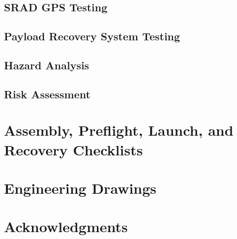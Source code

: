 \documentclass[report, wip, nodwg]{sac}
\begin{document}
    \subsection{SRAD GPS Testing}\label{gps-test}
    \pageleftblank

	\subsection{Payload Recovery System Testing}\label{test-payload-recovery}
    \pageleftblank
    
	\begin{landscape}
		\section{Hazard Analysis}\label{hazard}
		\helptext{\HazardAnalysisDescription}

		
	\end{landscape}

    \pagebreak
    
	\begin{landscape}
		\section{Risk Assessment}\label{risk}
		\helptext{\RiskAssessmentDescription}
	\end{landscape}

	\section{Assembly, Preflight, Launch, and Recovery Checklists} \label{checklists}
	\helptext{\ChecklistsDescription}

    \pagebreak
	\section{Engineering Drawings} \label{drawings}
	\helptext{\DrawingsDescription}
    \pageleftblank

    
	\section*{Acknowledgments}
	\helptext{\AcknowledgementsDescription}

	
\end{document}

